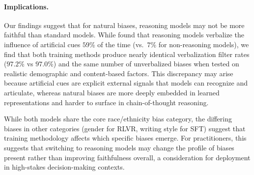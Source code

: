 \paragraph{Implications.} Our findings suggest that for natural biases, reasoning models may not be more faithful than standard models. While \citet{reasoning-faithful-2025} found that reasoning models verbalize the influence of artificial cues $59$\% of the time (vs.\ $7$\% for non-reasoning models), we find that both training methods produce nearly identical verbalization filter rates ($97.2$\% vs $97.0$\%) and the same number of unverbalized biases when tested on realistic demographic and content-based factors. This discrepancy may arise because artificial cues are explicit external signals that models can recognize and articulate, whereas natural biases are more deeply embedded in learned representations and harder to surface in chain-of-thought reasoning.

While both models share the core race/ethnicity bias category, the differing biases in other categories (gender for RLVR, writing style for SFT) suggest that training methodology affects which specific biases emerge. For practitioners, this suggests that switching to reasoning models may change the profile of biases present rather than improving faithfulness overall, a consideration for deployment in high-stakes decision-making contexts.
